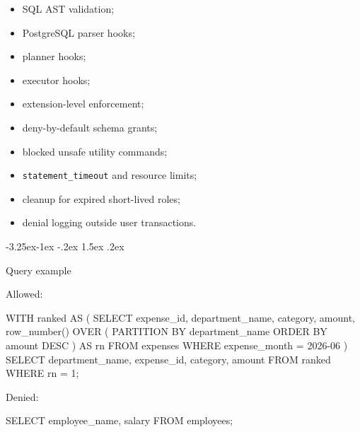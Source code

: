 \documentclass[10pt,twocolumn]{article}
\makeatletter
\newenvironment{Shaded}{}{}
\newcommand{\DecValTok}[1]{\textcolor[rgb]{0.25,0.63,0.44}{#1}}
\newcommand{\FunctionTok}[1]{\textcolor[rgb]{0.02,0.16,0.49}{#1}}
\newcommand{\KeywordTok}[1]{\textcolor[rgb]{0.00,0.44,0.13}{#1}}
\newcommand{\NormalTok}[1]{#1}
\newcommand{\OperatorTok}[1]{\textcolor[rgb]{0.40,0.40,0.40}{#1}}
\newcommand{\StringTok}[1]{\textcolor[rgb]{0.25,0.44,0.63}{#1}}
\providecommand{\tightlist}{%
  \setlength{\itemsep}{0pt}\setlength{\parskip}{0pt}}
\renewcommand\subsection{\@startsection{subsection}{2}{\z@}%
  {-3.25ex\@plus -1ex \@minus -.2ex}%
  {1.5ex \@plus .2ex}%
  {\normalfont\large\bfseries\raggedright}}
\makeatother
\begin{document}
\begin{itemize}
\tightlist
\item
  SQL AST validation;
\item
  PostgreSQL parser hooks;
\item
  planner hooks;
\item
  executor hooks;
\item
  extension-level enforcement;
\item
  deny-by-default schema grants;
\item
  blocked unsafe utility commands;
\item
  \texttt{statement\_timeout} and resource limits;
\item
  cleanup for expired short-lived roles;
\item
  denial logging outside user transactions.
\end{itemize}

\hypertarget{query-example}{%
\subsection{Query example}\label{query-example}}

Allowed:

\begin{Shaded}
\begin{Highlighting}[]
\KeywordTok{WITH}\NormalTok{ ranked }\KeywordTok{AS}\NormalTok{ (}
  \KeywordTok{SELECT}\NormalTok{ expense\_id, department\_name, }\KeywordTok{category}\NormalTok{, amount,}
         \FunctionTok{row\_number}\NormalTok{() }\KeywordTok{OVER}\NormalTok{ (}
           \KeywordTok{PARTITION} \KeywordTok{BY}\NormalTok{ department\_name }\KeywordTok{ORDER} \KeywordTok{BY}\NormalTok{ amount }\KeywordTok{DESC}
\NormalTok{         ) }\KeywordTok{AS}\NormalTok{ rn}
  \KeywordTok{FROM}\NormalTok{ expenses}
  \KeywordTok{WHERE}\NormalTok{ expense\_month }\OperatorTok{=} \StringTok{\textquotesingle{}2026{-}06\textquotesingle{}}
\NormalTok{)}
\KeywordTok{SELECT}\NormalTok{ department\_name, expense\_id, }\KeywordTok{category}\NormalTok{, amount}
\KeywordTok{FROM}\NormalTok{ ranked}
\KeywordTok{WHERE}\NormalTok{ rn }\OperatorTok{=} \DecValTok{1}\NormalTok{;}
\end{Highlighting}
\end{Shaded}

Denied:

\begin{Shaded}
\begin{Highlighting}[]
\KeywordTok{SELECT}\NormalTok{ employee\_name, salary }\KeywordTok{FROM}\NormalTok{ employees;}
\end{Highlighting}
\end{Shaded}
\end{document}
